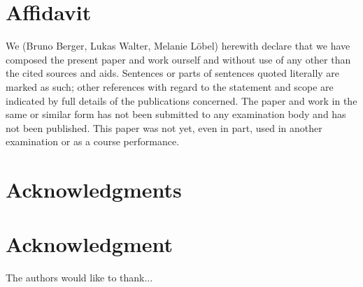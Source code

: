 \documentclass[conference,compsoc]{IEEEtran}
\begin{document}




%
\IEEEpeerreviewmaketitle








\section{Affidavit}
We (Bruno Berger, Lukas Walter, Melanie Löbel) herewith declare that we have composed the present paper and work ourself and without use of any other than the cited sources and aids. Sentences or parts of sentences quoted literally are marked as such; other references with regard to the statement and scope are indicated by full details of the publications concerned. The paper and work in the same or similar form has not been submitted to any examination body and has not been published. This paper was not yet, even in part, used in another examination or as a course performance.






\ifCLASSOPTIONcompsoc
  \section*{Acknowledgments}
\else
  \section*{Acknowledgment}
\fi


The authors would like to thank...







\printbibliography


\end{document}
